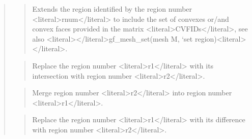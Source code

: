\documentclass[a4paper,11pt,english]{sphinxmanual}
\begin{document}
\begin{quote}
\sphinxAtStartPar
{}
\begin{quote}

\sphinxAtStartPar
Extends the region identified by the region number \textless{}literal\textgreater{}rnum\textless{}/literal\textgreater{} to include
the set of convexes or/and convex faces provided in the matrix
\textless{}literal\textgreater{}CVFIDs\textless{}/literal\textgreater{}, see also \textless{}literal\textgreater{}\textless{}/literal\textgreater{}gf\_mesh\_set(mesh M, ‘set region)\textless{}literal\textgreater{}\textless{}/literal\textgreater{}.
\end{quote}

\sphinxAtStartPar
{}
\begin{quote}

\sphinxAtStartPar
Replace the region number \textless{}literal\textgreater{}r1\textless{}/literal\textgreater{} with its intersection with region number \textless{}literal\textgreater{}r2\textless{}/literal\textgreater{}.
\end{quote}

\sphinxAtStartPar
{}
\begin{quote}

\sphinxAtStartPar
Merge region number \textless{}literal\textgreater{}r2\textless{}/literal\textgreater{} into region number \textless{}literal\textgreater{}r1\textless{}/literal\textgreater{}.
\end{quote}

\sphinxAtStartPar
{}
\begin{quote}

\sphinxAtStartPar
Replace the region number \textless{}literal\textgreater{}r1\textless{}/literal\textgreater{} with its difference with region
number \textless{}literal\textgreater{}r2\textless{}/literal\textgreater{}.
\end{quote}

\sphinxAtStartPar
{}
\begin{quote}


\end{quote}
\end{quote}
\end{document}
